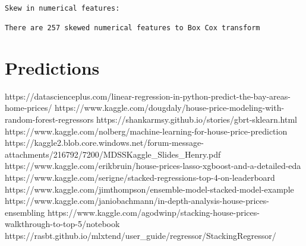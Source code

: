 \documentclass[11pt]{article}
\begin{document}
    \begin{Verbatim}[commandchars=\\\{\}]

Skew in numerical features: 

There are 257 skewed numerical features to Box Cox transform

    \end{Verbatim}

    \section{Predictions}\label{predictions}

    https://datascienceplus.com/linear-regression-in-python-predict-the-bay-areas-home-prices/
https://www.kaggle.com/dougdaly/house-price-modeling-with-random-forest-regressors
https://shankarmsy.github.io/stories/gbrt-sklearn.html
https://www.kaggle.com/nolberg/machine-learning-for-house-price-prediction
https://kaggle2.blob.core.windows.net/forum-message-attachments/216792/7200/MDSSKaggle\_Slides\_Henry.pdf
https://www.kaggle.com/erikbruin/house-prices-lasso-xgboost-and-a-detailed-eda
https://www.kaggle.com/serigne/stacked-regressions-top-4-on-leaderboard
https://www.kaggle.com/jimthompson/ensemble-model-stacked-model-example
https://www.kaggle.com/janiobachmann/in-depth-analysis-house-prices-ensembling
https://www.kaggle.com/agodwinp/stacking-house-prices-walkthrough-to-top-5/notebook
https://rasbt.github.io/mlxtend/user\_guide/regressor/StackingRegressor/
\end{document}
